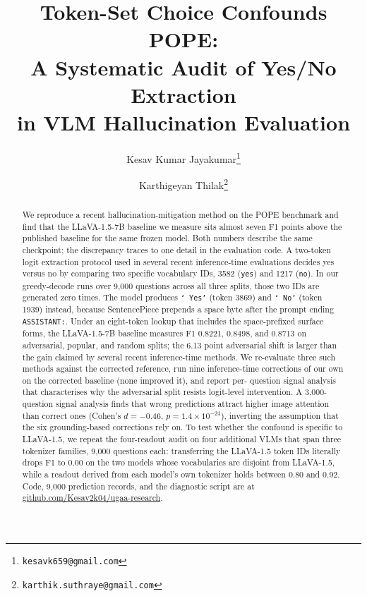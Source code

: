 \documentclass[11pt,letterpaper]{article}
\title{\Large\bfseries Token-Set Choice Confounds POPE:\\
A Systematic Audit of Yes/No Extraction\\
in VLM Hallucination Evaluation}
\author[1]{Kesav Kumar Jayakumar\thanks{\texttt{kesavk659@gmail.com}}}
\author[2]{Karthigeyan Thilak\thanks{\texttt{karthik.suthraye@gmail.com}}}
\affil[1]{Department of Information Technology, Sri Krishna College of Technology, Coimbatore 641042, India}
\affil[2]{Department of Computer Science and Engineering, Sri Eshwar College of Engineering, Coimbatore 641038, India}
\date{}
\begin{document}
\maketitle
\thispagestyle{fancy}


\begin{abstract}
We reproduce a recent hallucination-mitigation method on the POPE
benchmark and find that the LLaVA-1.5-7B baseline we measure sits
almost seven F1 points above the published baseline for the same
frozen model. Both numbers describe the same checkpoint; the
discrepancy traces to one detail in the evaluation code. A two-token
logit extraction protocol used in several recent inference-time
evaluations decides yes versus no by comparing two specific vocabulary
IDs, 3582 (\texttt{yes}) and 1217 (\texttt{no}). In our greedy-decode
runs over 9{,}000 questions across all three splits, those two IDs are
generated zero times. The model produces \texttt{`\,Yes'} (token 3869)
and \texttt{`\,No'} (token 1939) instead, because SentencePiece
prepends a space byte after the prompt ending \texttt{ASSISTANT:}.
Under an eight-token lookup that includes the space-prefixed surface
forms, the LLaVA-1.5-7B baseline measures F1 0.8221, 0.8498, and
0.8713 on adversarial, popular, and random splits; the 6.13 point
adversarial shift is larger than the gain claimed by several recent
inference-time methods. We re-evaluate three such methods against
the corrected reference, run nine inference-time corrections of our
own on the corrected baseline (none improved it), and report per-
question signal analysis that characterises why the adversarial split
resists logit-level intervention. A 3{,}000-question signal analysis
finds that wrong predictions attract higher image attention than correct
ones (Cohen's $d=-0.46$, $p=1.4\times10^{-24}$), inverting the assumption
that the six grounding-based corrections rely on. To test whether the confound is
specific to LLaVA-1.5, we repeat the four-readout audit on four
additional VLMs that span three tokenizer families, 9{,}000 questions
each: transferring the LLaVA-1.5 token IDs literally drops F1 to 0.00 on
the two models whose vocabularies are disjoint from LLaVA-1.5, while a
readout derived from each model's own tokenizer holds between 0.80 and
0.92. Code, 9{,}000 prediction records, and
the diagnostic script are at
\href{https://github.com/Kesav2k04/ugaa-research}{github.com/Kesav2k04/ugaa-research}.
\end{abstract}
\end{document}
